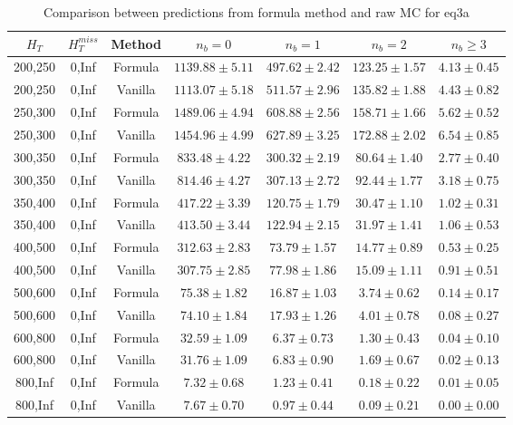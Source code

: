 \begin{longtable}{ | c | c | c | c | c | c | c | }
\caption{Comparison between predictions from formula method and raw MC for eq3a} \label{tab:formula-eq3a} \\    \hline 
$H_{T}$ & $H_{T}^{miss}$ & Method & $n_{b} = 0$ & $n_{b} = 1$ & $n_{b} = 2$ & $n_{b} \ge 3$ \\ \hline200,250 & 0,Inf & Formula  & $  1139.88 \pm  5.11 $ & $   497.62 \pm  2.42 $ & $   123.25 \pm  1.57 $ & $     4.13 \pm  0.45 $  \\  
200,250 & 0,Inf & Vanilla  & $  1113.07 \pm  5.18 $ & $   511.57 \pm  2.96 $ & $   135.82 \pm  1.88 $ & $     4.43 \pm  0.82 $  \\ \hline 
250,300 & 0,Inf & Formula  & $  1489.06 \pm  4.94 $ & $   608.88 \pm  2.56 $ & $   158.71 \pm  1.66 $ & $     5.62 \pm  0.52 $  \\  
250,300 & 0,Inf & Vanilla  & $  1454.96 \pm  4.99 $ & $   627.89 \pm  3.25 $ & $   172.88 \pm  2.02 $ & $     6.54 \pm  0.85 $  \\ \hline 
300,350 & 0,Inf & Formula  & $   833.48 \pm  4.22 $ & $   300.32 \pm  2.19 $ & $    80.64 \pm  1.40 $ & $     2.77 \pm  0.40 $  \\  
300,350 & 0,Inf & Vanilla  & $   814.46 \pm  4.27 $ & $   307.13 \pm  2.72 $ & $    92.44 \pm  1.77 $ & $     3.18 \pm  0.75 $  \\ \hline 
350,400 & 0,Inf & Formula  & $   417.22 \pm  3.39 $ & $   120.75 \pm  1.79 $ & $    30.47 \pm  1.10 $ & $     1.02 \pm  0.31 $  \\  
350,400 & 0,Inf & Vanilla  & $   413.50 \pm  3.44 $ & $   122.94 \pm  2.15 $ & $    31.97 \pm  1.41 $ & $     1.06 \pm  0.53 $  \\ \hline 
400,500 & 0,Inf & Formula  & $   312.63 \pm  2.83 $ & $    73.79 \pm  1.57 $ & $    14.77 \pm  0.89 $ & $     0.53 \pm  0.25 $  \\  
400,500 & 0,Inf & Vanilla  & $   307.75 \pm  2.85 $ & $    77.98 \pm  1.86 $ & $    15.09 \pm  1.11 $ & $     0.91 \pm  0.51 $  \\ \hline 
500,600 & 0,Inf & Formula  & $    75.38 \pm  1.82 $ & $    16.87 \pm  1.03 $ & $     3.74 \pm  0.62 $ & $     0.14 \pm  0.17 $  \\  
500,600 & 0,Inf & Vanilla  & $    74.10 \pm  1.84 $ & $    17.93 \pm  1.26 $ & $     4.01 \pm  0.78 $ & $     0.08 \pm  0.27 $  \\ \hline 
600,800 & 0,Inf & Formula  & $    32.59 \pm  1.09 $ & $     6.37 \pm  0.73 $ & $     1.30 \pm  0.43 $ & $     0.04 \pm  0.10 $  \\  
600,800 & 0,Inf & Vanilla  & $    31.76 \pm  1.09 $ & $     6.83 \pm  0.90 $ & $     1.69 \pm  0.67 $ & $     0.02 \pm  0.13 $  \\ \hline 
800,Inf & 0,Inf & Formula  & $     7.32 \pm  0.68 $ & $     1.23 \pm  0.41 $ & $     0.18 \pm  0.22 $ & $     0.01 \pm  0.05 $  \\  
800,Inf & 0,Inf & Vanilla  & $     7.67 \pm  0.70 $ & $     0.97 \pm  0.44 $ & $     0.09 \pm  0.21 $ & $     0.00 \pm  0.00 $  \\ \hline 
    \hline 
    \hline 
\end{longtable}
